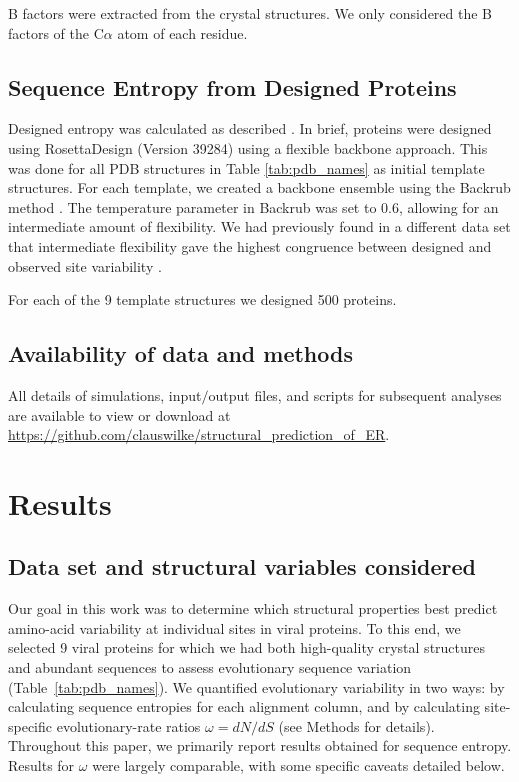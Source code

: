 \documentclass[smallextended]{svjour3}
\begin{document}
B factors were extracted from the crystal structures. We only considered the B factors of the C$\alpha$ atom of each residue.


\subsection*{Sequence Entropy from Designed Proteins}

Designed entropy was calculated as described \citep{Jacksonetal2013}. In brief, proteins were designed using RosettaDesign (Version 39284) \citep{LeaverFayetal2011} using a flexible backbone approach. This was done for all PDB structures in Table \ref{tab:pdb_names} as initial template structures. For each template, we created a backbone ensemble using the Backrub method \citep{Smith2008}. The temperature parameter in Backrub was set to 0.6, allowing for an intermediate amount of flexibility. We had previously found in a different data set that intermediate flexibility gave the highest congruence between designed and observed site variability \citep{Jacksonetal2013}.

For each of the 9 template structures we designed 500 proteins.

\subsection*{Availability of data and methods}

All details of simulations, input$/$output files, and scripts for subsequent analyses are available to view or download at \url{https://github.com/clauswilke/structural\_prediction\_of\_ER}.

\section*{Results}

\subsection*{Data set and structural variables considered}

Our goal in this work was to determine which structural properties best predict amino-acid variability at individual sites in viral proteins. To this end, we selected 9 viral proteins for which we had both high-quality crystal structures and abundant sequences to assess evolutionary sequence variation (Table~\ref{tab:pdb_names}). We quantified evolutionary variability in two ways: by calculating sequence entropies for each alignment column, and by calculating site-specific evolutionary-rate ratios $\omega=dN/dS$ (see Methods for details). Throughout this paper, we primarily report results obtained for sequence entropy. Results for $\omega$ were largely comparable, with some specific caveats detailed below.
\end{document}
